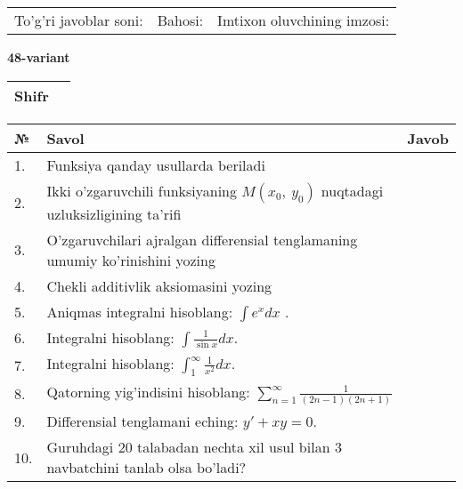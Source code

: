 \documentclass{article}
\begin{document}
  \vspace{1cm}
  
  \begin{tabular}{lll}
  To'g'ri javoblar soni: \underline{\hspace{1.5cm}} & 
  Bahosi: \underline{\hspace{1.5cm}} & 
  Imtixon oluvchining imzosi: \underline{\hspace{2cm}} \\
  \end{tabular}
  
  \egroup
  
  \newpage
  
  
  \textbf{48-variant}\\
  
  \bgroup
  \def\arraystretch{1.6} %
  
  \begin{tabular}{|m{5.7cm}|m{9.5cm}|}
  \hline
  Shifr & \\
  \hline
  \end{tabular}
  
  \vspace{1cm}
  
  \begin{tabular}{|m{0.7cm}|m{10cm}|m{4cm}|}
  \hline
  № & Savol & Javob \\
  \hline
  1. & Funksiya qanday usullarda beriladi &  \\
  \hline
  2. & Ikki o'zgaruvchili funksiyaning \(M(x_{0},\ y_{0})\) nuqtadagi uzluksizligining ta'rifi &  \\
  \hline
  3. & O'zgaruvchilari ajralgan differensial tenglamaning umumiy ko'rinishini yozing &  \\
  \hline
  4. & Chekli additivlik aksiomasini yozing &  \\
  \hline
  5. & Aniqmas integralni hisoblang: \(\int {e^{x}dx}\) . &  \\
  \hline
  6. & Integralni hisoblang: \(\int {\frac{1}{\sin x}dx}\). &  \\
  \hline
  7. & Integralni hisoblang: \(\int_{1}^{\infty}{\frac{1}{x^{2}}dx}\). &  \\
  \hline
  8. & Qatorning yig'indisini hisoblang: \(\sum_{n = 1}^{\infty}\frac{1}{(2n - 1)(2n + 1)}\) &  \\
  \hline
  9. & Differensial tenglamani eching: \(y' + xy = 0\). &  \\
  \hline
  10. & Guruhdagi 20 talabadan nechta xil usul bilan 3 navbatchini tanlab olsa bo'ladi? &  \\
  \hline
  \end{tabular}
  
\end{document}
